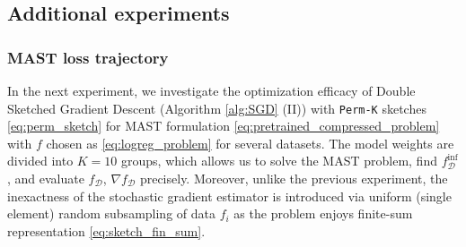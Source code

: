 \documentclass{article}
\newcommand{\bb}{\mathbb}
\newcommand{\R}{\bb R}
\theoremstyle{plain}
\newcommand{\tf}{f_{\mathcal{D}}}
\theoremstyle{plain}
\theoremstyle{definition}
\theoremstyle{remark}
\begin{document}

\subsection{Additional experiments}\label{sec:add_experiments}

\subsubsection{MAST loss trajectory}
In the next experiment, we investigate the optimization efficacy of Double Sketched Gradient Descent (Algorithm \ref{alg:SGD} (II)) with \texttt{Perm-K} sketches \eqref{eq:perm_sketch} for MAST formulation \eqref{eq:pretrained_compressed_problem} with $f$ chosen as \eqref{eq:logreg_problem} for several datasets. The model weights are divided into $K=10$ groups, which allows us to solve the MAST problem, find $\tf^{\inf}$, and evaluate $\tf$, $\nabla \tf$ precisely. Moreover, unlike the previous experiment, the inexactness of the stochastic gradient estimator is introduced via uniform (single element) random subsampling of data $f_i$ as the problem enjoys finite-sum representation \eqref{eq:sketch_fin_sum}.
\end{document}
